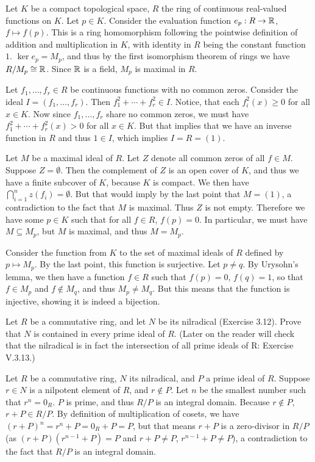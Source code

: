 \begin{solution}
	Let $K$ be a compact topological space, $R$ the ring of continuous real-valued functions on $K$. Let $p \in K$. Consider the evaluation function $e_p: R \to \mathbb{R}$, $f \mapsto f(p)$. This is a ring homomorphism following the pointwise definition of addition and multiplication in $K$, with identity in $R$ being the constant function $1$. $\ker e_p = M_p$, and thus by the first isomorphism theorem of rings we have $R/M_p \cong \mathbb{R}$. Since $\mathbb{R}$ is a field, $M_p$ is maximal in $R$.
	
	Let $f_1, \dots, f_r \in R$ be continuous functions with no common zeros. Consider the ideal $I = (f_1, \dots, f_r)$. Then $f_1^2 + \cdots + f_r^2 \in I$. Notice, that each $f_i^2(x) \geq 0$ for all $x \in K$. Now since $f_1, \dots, f_r$ share no common zeros, we must have $f_1^2 + \cdots + f_r^2(x) > 0$ for all $x \in K$. But that implies that we have an inverse function in $R$ and thus $1 \in I$, which implies $I = R = (1)$.
	
	Let $M$ be a maximal ideal of $R$. Let $Z$ denote all common zeros of all $f \in M$. Suppose $Z = \emptyset$. Then the complement of $Z$ is an open cover of $K$, and thus we have a finite subcover of $K$, because $K$ is compact. We then have $\bigcap^n_{i=1} z(f_i) = \emptyset$. But that would imply by the last point that $M = (1)$, a contradiction to the fact that $M$ is maximal. Thus $Z$ is not empty. Therefore we have some $p \in K$ such that for all $f \in R$, $f(p) = 0$. In particular, we must have $M \subseteq M_p$, but $M$ is maximal, and thus $M = M_p$.
	
	Consider the function from $K$ to the set of maximal ideals of $R$ defined by $p \mapsto M_p$. By the last point, this function is surjective. Let $p \neq q$. By Urysohn's lemma, we then have a function $f \in R$ such that $f(p) = 0$, $f(q) = 1$, so that $f \in M_p$ and $f \not \in M_q$, and thus $M_p \neq M_q$. But this means that the function is injective, showing it is indeed a bijection.
\end{solution}

\begin{problem}
	Let $R$ be a commutative ring, and let $N$ be its nilradical (Exercise 3.12). Prove that $N$ is contained in every prime ideal of $R$. (Later on the reader will check that the nilradical is in fact the intersection of all prime ideals of R: Exercise V.3.13.)
\end{problem}

\begin{solution}
	Let $R$ be a commutative ring, $N$ its nilradical, and $P$ a prime ideal of $R$. Suppose $r \in N$ is a nilpotent element of $R$, and $r \not \in P$. Let $n$ be the smallest number such that $r^n = 0_R$. $P$ is prime, and thus $R/P$ is an integral domain. Because $r \not \in P$, $r + P \in R/P$. By definition of multiplication of cosets, we have $(r + P)^n = r^n + P = 0_R + P = P$, but that means $r + P$ is a zero-divisor in $R/P$ (as $(r + P)(r^{n-1} + P) = P$ and $r + P \neq P$, $r^{n-1} + P \neq P$), a contradiction to the fact that $R/P$ is an integral domain. 
\end{solution}

